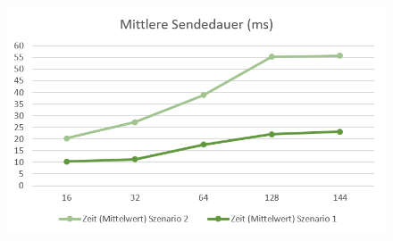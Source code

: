 \documentclass[]{scrartcl}
\begin{document}
\begin{figure}[H]
	\centering
	\includegraphics[width=1\linewidth]{Zeit.png}
	\label{fig:Diagramm_Zeit}
\end{figure}
\end{document}
